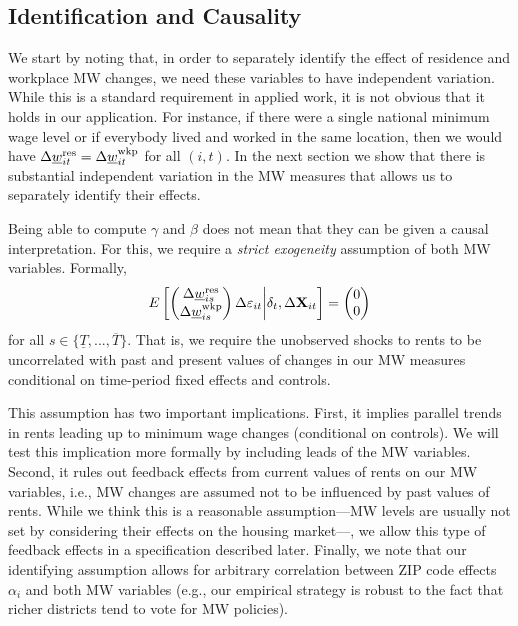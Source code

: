 \subsection{Identification and Causality}

We start by noting that, in order to separately identify the effect of 
residence and workplace MW changes, we need these variables to have independent
variation.
While this is a standard requirement in applied work, it is not obvious that it 
holds in our application.
For instance, if there were a single national minimum wage level or if everybody 
lived and worked in the same location, then we would have
$\Delta \underline{w}^{\text{res}}_{it} = \Delta \underline{w}^{\text{wkp}}_{it}$ for all $(i,t)$.
In the next section we show that there is substantial independent variation
in the MW measures that allows us to separately identify their effects.

Being able to compute $\gamma$ and $\beta$ does not mean that they can be given
a causal interpretation.
For this, we require a \textit{strict exogeneity} assumption of both MW 
variables. 
Formally,
\begin{equation}\label{eq:strict_exogeneity}
    E\left[
        \begin{pmatrix}
            \Delta \underline{w}^{\text{res}}_{is} \\
            \Delta \underline{w}^{\text{wkp}}_{is} \\
        \end{pmatrix}
        \Delta \varepsilon_{it}
    \bigg| \delta_t, \Delta \mathbf{X}_{it} \right] =
    \begin{pmatrix}
        0 \\
        0 \\
    \end{pmatrix}
\end{equation}
for all $s\in\{\underline{T}, ..., \overline{T}\}$.
That is, we require the unobserved shocks to rents to be uncorrelated with 
past and present values of changes in our MW measures 
conditional on time-period fixed effects and controls.

This assumption has two important implications.
First,
it implies parallel trends in rents leading up to minimum wage changes 
(conditional on controls). We will test this implication more formally by 
including leads of the MW variables.
Second,
it rules out feedback effects from current values of rents on our MW variables, 
i.e., MW changes are assumed not to be influenced by past values of rents.
While we think this is a reasonable assumption---MW levels are usually not 
set by considering their effects on the housing market---, we allow this type of 
feedback effects in a specification described later.
Finally, we note that our identifying assumption allows for arbitrary 
correlation between ZIP code effects $\alpha_i$ and both MW variables
(e.g., our empirical strategy is robust to the fact that richer districts tend 
to vote for MW policies).

